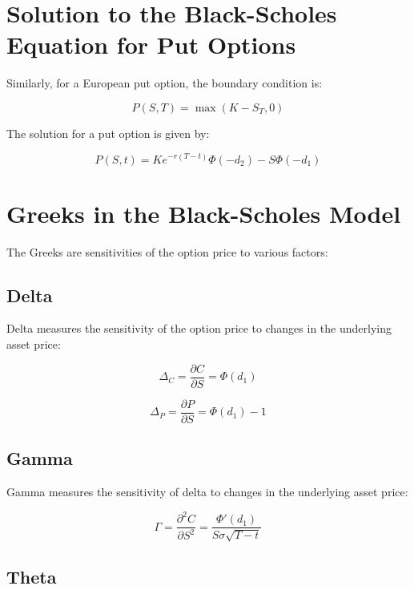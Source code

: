 \documentclass[../main.tex]{subfiles}
\begin{document}
\section{Solution to the Black-Scholes Equation for Put Options}

Similarly, for a European put option, the boundary condition is:

\begin{equation}
    P(S, T) = \max(K - S_T, 0)
\end{equation}

The solution for a put option is given by:

\begin{equation}
    P(S, t) = K e^{-r(T-t)} \Phi(-d_2) - S \Phi(-d_1)
\end{equation}

\section{Greeks in the Black-Scholes Model}

The Greeks are sensitivities of the option price to various factors:

\subsection{Delta}

Delta measures the sensitivity of the option price to changes in the underlying asset price:

\begin{equation}
    \Delta_C = \frac{\partial C}{\partial S} = \Phi(d_1)
\end{equation}

\begin{equation}
    \Delta_P = \frac{\partial P}{\partial S} = \Phi(d_1) - 1
\end{equation}

\subsection{Gamma}

Gamma measures the sensitivity of delta to changes in the underlying asset price:

\begin{equation}
    \Gamma = \frac{\partial^2 C}{\partial S^2} = \frac{\Phi'(d_1)}{S \sigma \sqrt{T - t}}
\end{equation}

\subsection{Theta}
\end{document}
